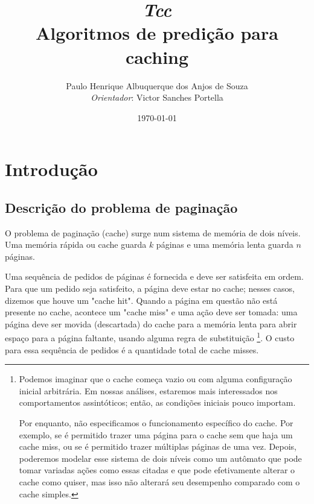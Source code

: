 \documentclass[a4paper,oneside,reqno,12pt]{amsart}
\begin{document}
\baselineskip
\frenchspacing

% 
% 

\setcounter{page}{1}

\title{%
{\small\sl Tcc}\\
\smallskip
Algoritmos de predição para caching}

\author{%
Paulo Henrique Albuquerque dos Anjos de Souza \\
{\tiny\emph{Orientador}:  Victor Sanches Portella}
}
%
%

\date{\today}
\maketitle

\pagestyle{plain}
\footskip=25pt

\vspace{-20pt}


\section{Introdução}
\subsection{Descrição do problema de paginação}

\label{sec:intro}

O problema de paginação (cache) surge num sistema de memória de dois níveis. Uma memória rápida ou cache guarda $k$ páginas e uma memória lenta guarda $n$ páginas.

Uma sequência de pedidos de páginas é fornecida e deve ser satisfeita em ordem. Para que um pedido seja satisfeito, a página deve estar no cache; nesses casos, dizemos que houve um "cache hit". Quando a página em questão não está presente no cache, acontece um "cache miss" e uma ação deve ser tomada: uma página deve ser movida (descartada) do cache para a memória lenta para abrir espaço para a página faltante, usando alguma regra de substituição \footnote{Podemos imaginar que o cache começa vazio ou com alguma configuração inicial arbitrária. Em nossas análises, estaremos mais interessados nos comportamentos assintóticos; então, as condições iniciais pouco importam.

Por enquanto, não especificamos o funcionamento específico do cache. Por exemplo, se é permitido trazer uma página para o cache sem que haja um cache miss, ou se é permitido trazer múltiplas páginas de uma vez. Depois, poderemos modelar esse sistema de dois níveis como um autômato que pode tomar variadas ações como essas citadas e que pode efetivamente alterar o cache como quiser, mas isso não alterará seu desempenho comparado com o cache simples.}. O custo para essa sequência de pedidos é a quantidade total de cache misses.
\end{document}

